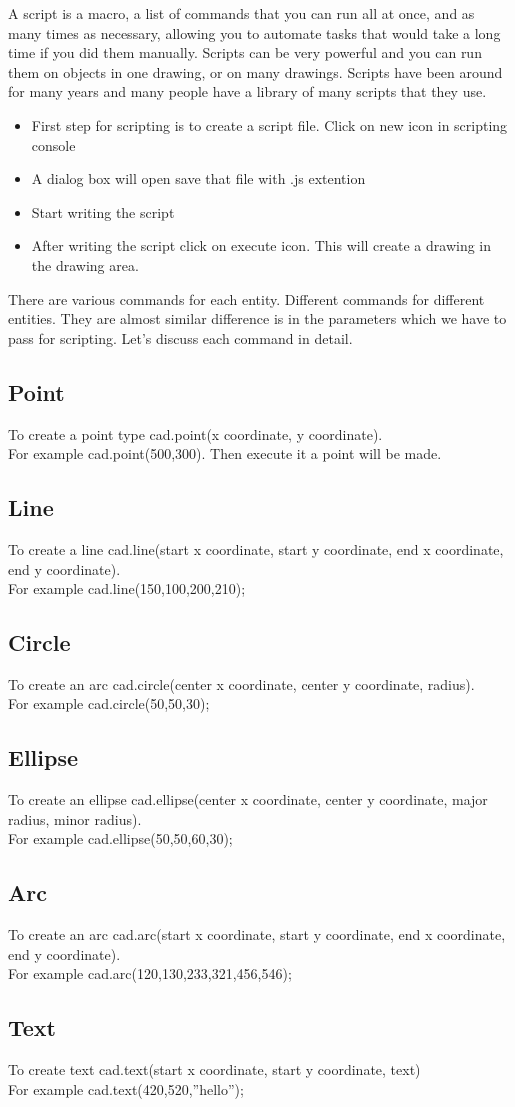 A script is a macro, a list of commands that you can run all at once, and as many times as necessary, allowing you to automate tasks that would take a long time if you did them manually. Scripts can be very powerful and you can run them on  objects in one drawing, or on many drawings. Scripts have been around for many years and many people have a library of many scripts that they use.\\
\begin{itemize}
\item First step for scripting is to create a script file. Click on new icon in scripting console
\item A dialog box will open save that file with .js extention
\item Start writing the script 
\item After writing the script click on execute icon. This will create a drawing in the drawing  area. 
\end{itemize}
There are various commands for each entity. Different commands for different entities. They are almost similar difference is in the parameters which we have to pass for scripting. Let's discuss each command in detail.
\subsection{Point}
To create a point type cad.point(x coordinate, y coordinate).\\
For example cad.point(500,300). Then execute it a point will be made.
\subsection{Line}
To create a line cad.line(start x coordinate, start y coordinate, end x coordinate, end y coordinate).\\
For example cad.line(150,100,200,210);
\subsection{Circle}
To create an arc cad.circle(center x coordinate, center y coordinate, radius).\\
For example cad.circle(50,50,30);
\subsection{Ellipse}
To create an ellipse cad.ellipse(center x coordinate, center y coordinate, major radius, minor radius).\\
For example cad.ellipse(50,50,60,30);
\subsection{Arc}
To create an arc cad.arc(start x coordinate, start y coordinate, end x coordinate, end y coordinate).\\
For example cad.arc(120,130,233,321,456,546);
\subsection{Text}
To create text cad.text(start x coordinate, start y coordinate, text)\\
For example cad.text(420,520,”hello”);